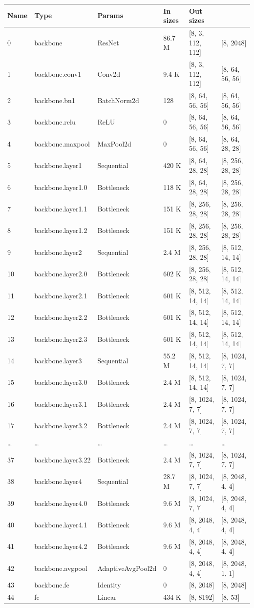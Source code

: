 \documentclass[]{article}
\begin{document}
\begin{longtable}[]{@{}llllll@{}}
\toprule
Name & Type & Params & In sizes & Out sizes &\tabularnewline
\midrule
\endhead
0 & backbone & ResNet & 86.7 M & {[}8, 3, 112, 112{]} & {[}8,
2048{]}\tabularnewline
1 & backbone.conv1 & Conv2d & 9.4 K & {[}8, 3, 112, 112{]} & {[}8, 64,
56, 56{]}\tabularnewline
2 & backbone.bn1 & BatchNorm2d & 128 & {[}8, 64, 56, 56{]} & {[}8, 64,
56, 56{]}\tabularnewline
3 & backbone.relu & ReLU & 0 & {[}8, 64, 56, 56{]} & {[}8, 64, 56,
56{]}\tabularnewline
4 & backbone.maxpool & MaxPool2d & 0 & {[}8, 64, 56, 56{]} & {[}8, 64,
28, 28{]}\tabularnewline
5 & backbone.layer1 & Sequential & 420 K & {[}8, 64, 28, 28{]} & {[}8,
256, 28, 28{]}\tabularnewline
6 & backbone.layer1.0 & Bottleneck & 118 K & {[}8, 64, 28, 28{]} & {[}8,
256, 28, 28{]}\tabularnewline
7 & backbone.layer1.1 & Bottleneck & 151 K & {[}8, 256, 28, 28{]} &
{[}8, 256, 28, 28{]}\tabularnewline
8 & backbone.layer1.2 & Bottleneck & 151 K & {[}8, 256, 28, 28{]} &
{[}8, 256, 28, 28{]}\tabularnewline
9 & backbone.layer2 & Sequential & 2.4 M & {[}8, 256, 28, 28{]} & {[}8,
512, 14, 14{]}\tabularnewline
10 & backbone.layer2.0 & Bottleneck & 602 K & {[}8, 256, 28, 28{]} &
{[}8, 512, 14, 14{]}\tabularnewline
11 & backbone.layer2.1 & Bottleneck & 601 K & {[}8, 512, 14, 14{]} &
{[}8, 512, 14, 14{]}\tabularnewline
12 & backbone.layer2.2 & Bottleneck & 601 K & {[}8, 512, 14, 14{]} &
{[}8, 512, 14, 14{]}\tabularnewline
13 & backbone.layer2.3 & Bottleneck & 601 K & {[}8, 512, 14, 14{]} &
{[}8, 512, 14, 14{]}\tabularnewline
14 & backbone.layer3 & Sequential & 55.2 M & {[}8, 512, 14, 14{]} &
{[}8, 1024, 7, 7{]}\tabularnewline
15 & backbone.layer3.0 & Bottleneck & 2.4 M & {[}8, 512, 14, 14{]} &
{[}8, 1024, 7, 7{]}\tabularnewline
16 & backbone.layer3.1 & Bottleneck & 2.4 M & {[}8, 1024, 7, 7{]} &
{[}8, 1024, 7, 7{]}\tabularnewline
17 & backbone.layer3.2 & Bottleneck & 2.4 M & {[}8, 1024, 7, 7{]} &
{[}8, 1024, 7, 7{]}\tabularnewline
\ldots{} & \ldots{} & \ldots{} & \ldots{} & \ldots{} &
\ldots{}\tabularnewline
37 & backbone.layer3.22 & Bottleneck & 2.4 M & {[}8, 1024, 7, 7{]} &
{[}8, 1024, 7, 7{]}\tabularnewline
38 & backbone.layer4 & Sequential & 28.7 M & {[}8, 1024, 7, 7{]} & {[}8,
2048, 4, 4{]}\tabularnewline
39 & backbone.layer4.0 & Bottleneck & 9.6 M & {[}8, 1024, 7, 7{]} &
{[}8, 2048, 4, 4{]}\tabularnewline
40 & backbone.layer4.1 & Bottleneck & 9.6 M & {[}8, 2048, 4, 4{]} &
{[}8, 2048, 4, 4{]}\tabularnewline
41 & backbone.layer4.2 & Bottleneck & 9.6 M & {[}8, 2048, 4, 4{]} &
{[}8, 2048, 4, 4{]}\tabularnewline
42 & backbone.avgpool & AdaptiveAvgPool2d & 0 & {[}8, 2048, 4, 4{]} &
{[}8, 2048, 1, 1{]}\tabularnewline
43 & backbone.fc & Identity & 0 & {[}8, 2048{]} & {[}8,
2048{]}\tabularnewline
44 & fc & Linear & 434 K & {[}8, 8192{]} & {[}8, 53{]}\tabularnewline
\bottomrule
\end{longtable}
\end{document}
